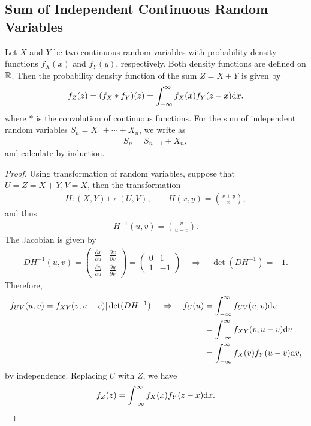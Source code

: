 \subsection*{Sum of Independent Continuous Random Variables}


\begin{theorem}
	\label{thrm:4}
	Let $X$ and $Y$ be two continuous random variables with probability density functions $f_X(x)$ and $f_Y(y)$, respectively. Both density functions are defined on $\mathbb{R}$. Then the probability density function of the sum $Z = X + Y$ is given by
	\begin{align*}
	f_Z(z) = (f_X * f_Y)(z) = \int_{-\infty}^{\infty} f_X(x) f_Y(z-x) \mathrm{d}x.
	\end{align*}
	where $*$ is the convolution of continuous functions. For the sum of independent random variables $S_n = X_1 + \cdots + X_n$, we write as
	\begin{align*}
	S_n = S_{n-1} + X_n,
	\end{align*}
	and calculate by induction.
\end{theorem}
\begin{proof}
	Using transformation of random variables, suppose that $U = Z = X + Y, V = X$, then the transformation 
	\begin{align*}
	H: (X, Y)\mapsto (U, V), \qquad H(x, y) = \binom{x+y}{x},
	\end{align*}
	and thus
	\begin{align*}
	H^{-1}(u, v) = \binom{v}{u-v}.
	\end{align*}
	The Jacobian is given by
	\begin{align*}
	DH^{-1}(u, v) = \begin{pmatrix}
	\frac{\partial x}{\partial u} & \frac{\partial x}{\partial v} \\
	\frac{\partial y}{\partial u} & \frac{\partial y}{\partial v}
	\end{pmatrix} = \begin{pmatrix}
	0 & 1 \\
	1 & -1
	\end{pmatrix} \quad \Rightarrow\quad \det(DH^{-1}) = -1.
	\end{align*}
	Therefore,
	\begin{align*}
	f_{UV}(u, v) = f_{XY}(v, u-v) |\det(DH^{-1})| \quad\Rightarrow\quad f_{U}(u) & = \int_{-\infty}^{\infty} f_{UV}(u, v)\mathrm{d}v \\
	& = \int_{-\infty}^{\infty} f_{XY}(v, u-v) \mathrm{d}v \\
	& = \int_{-\infty}^{\infty} f_X(v) f_Y(u-v) \mathrm{d}v,
	\end{align*}
	by independence. Replacing $U$ with $Z$, we have
	\begin{align*}
	f_Z(z) = \int_{-\infty}^{\infty} f_X(x)f_Y(z-x)\mathrm{d}x.
	\end{align*}
\end{proof}

